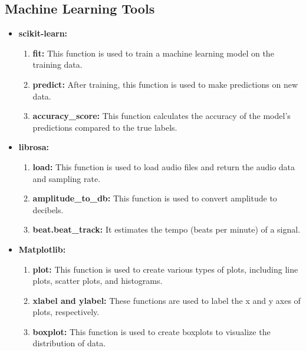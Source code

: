 \documentclass[11pt]{report}
\begin{document}
\subsection*{Machine Learning Tools}
\begin{itemize}
    \item \textbf{scikit-learn:}
    \begin{enumerate}
        \item \textbf{fit:} This function is used to train a machine learning model on the training data.
        \item \textbf{predict:} After training, this function is used to make predictions on new data.
        \item \textbf{accuracy\_score:} This function calculates the accuracy of the model's predictions compared to the true labels.
    \end{enumerate}
\end{itemize}

\begin{itemize}
    \item \textbf{librosa:}
    \begin{enumerate}
        \item \textbf{load:} This function is used to load audio files and return the audio data and sampling rate.
        \item \textbf{amplitude\_to\_db:} This function is used to convert amplitude to decibels.
        \item \textbf{beat.beat\_track:} It estimates the tempo (beats per minute) of a signal.
    \end{enumerate}
\end{itemize}

\begin{itemize}
    \item \textbf{Matplotlib:}
    \begin{enumerate}
        \item \textbf{plot:} This function is used to create various types of plots, including line plots, scatter plots, and histograms.
        \item \textbf{xlabel and ylabel:} These functions are used to label the x and y axes of plots, respectively.
        \item \textbf{boxplot:} This function is used to create boxplots to visualize the distribution of data.
    \end{enumerate}
\end{itemize}
\end{document}
